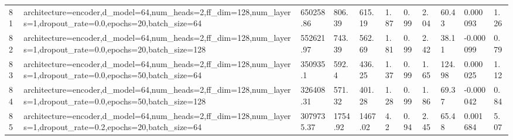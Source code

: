 \begin{longtable}{C{0.8cm} L{2cm} C{1.15cm} C{1.15cm} C{1.15cm} C{1.15cm} C{0.85cm} C{1.25cm} C{1.2cm} C{1.5cm} C{1.0cm}}
81 & architecture=encoder,\newline d\_model=64,\newline num\_heads=2,\newline ff\_dim=128,\newline num\_layers=1,\newline dropout\_rate=0.0,\newline epochs=20,\newline batch\_size=64 & 650258.86 & 806.39 & 615.19 & 1.87 & 0.99 & 2.04 & 60.43 & 0.000093 & 1.26 \\
82 & architecture=encoder,\newline d\_model=64,\newline num\_heads=2,\newline ff\_dim=128,\newline num\_layers=1,\newline dropout\_rate=0.0,\newline epochs=20,\newline batch\_size=128 & 552621.97 & 743.39 & 562.69 & 1.81 & 0.99 & 2.42 & 38.11 & -0.000099 & 0.79 \\
83 & architecture=encoder,\newline d\_model=64,\newline num\_heads=2,\newline ff\_dim=128,\newline num\_layers=1,\newline dropout\_rate=0.0,\newline epochs=50,\newline batch\_size=64 & 350935.1 & 592.4 & 436.25 & 1.37 & 0.99 & 1.65 & 124.98 & 0.000025 & 1.12 \\
84 & architecture=encoder,\newline d\_model=64,\newline num\_heads=2,\newline ff\_dim=128,\newline num\_layers=1,\newline dropout\_rate=0.0,\newline epochs=50,\newline batch\_size=128 & 326408.31 & 571.32 & 401.28 & 1.28 & 0.99 & 1.86 & 69.37 & -0.000042 & 0.84 \\
85 & architecture=encoder,\newline d\_model=64,\newline num\_heads=2,\newline ff\_dim=128,\newline num\_layers=1,\newline dropout\_rate=0.2,\newline epochs=20,\newline batch\_size=64 & 3079735.37 & 1754.92 & 1467.02 & 4.2 & 0.94 & 2.45 & 65.48 & 0.001684 & 5.07 \\

\end{longtable}
